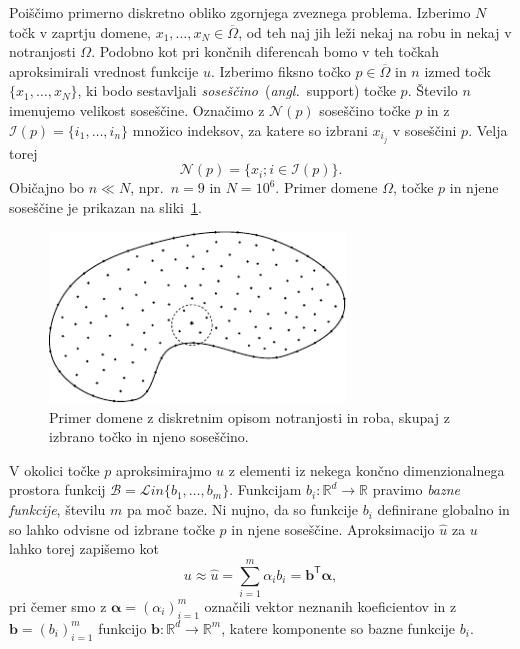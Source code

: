 \documentclass[12pt,a4paper,twoside]{article}
\theoremstyle{definition} %
\theoremstyle{plain} %
\numberwithin{equation}{section}
\newcommand{\R}{\mathbb R}
\newcommand{\Nc}{\mathcal{N}}
\newcommand{\I}{\mathcal{I}}
\newcommand{\B}{\mathcal{B}}
\newcommand{\T}{\mathsf{T}}
\renewcommand{\b}{\boldsymbol}
\newcommand{\zomega}{\overline{\Omega}}
\newcommand{\Lin}{\mathcal{L}in}
\newcommand{\uh}{\hat{u}}
\newcommand{\ang}[1]{(\textit{angl.}\ #1)}
\begin{document}
Poiščimo primerno diskretno obliko zgornjega zveznega problema.
Izberimo $N$ točk v zaprtju domene, $x_1, \dots, x_N \in \zomega$, od teh naj jih leži nekaj na robu
in nekaj v notranjosti $\Omega$. Podobno kot pri končnih diferencah bomo v teh točkah aproksimirali
vrednost funkcije $u$.  Izberimo fiksno točko $p \in \zomega$ in $n$ izmed točk $\{x_1, \dots,
x_N\}$, ki bodo sestavljali \emph{soseščino}~\ang{support} točke $p$. Število $n$ imenujemo velikost
soseščine.  Označimo z $\Nc(p)$ soseščino točke $p$ in z $\I(p) = \{i_1, \dots, i_n\}$ množico
indeksov, za katere so izbrani $x_{i_j}$ v soseščini $p$. Velja torej
\begin{equation}
  \Nc(p) = \{x_i; i \in \I(p)\}.
\end{equation}
Običajno bo $n \ll N$, npr.~$n = 9$ in $N = 10^6$.
Primer domene $\Omega$, točke $p$ in njene soseščine je prikazan na
sliki~\ref{fig:domain-example}.

\begin{figure}[ht]
  \centering
  \includegraphics[width=0.7\textwidth]{images/domain_theoretical.pdf}
  \caption[Domena in diskretizacija notranjosti in roba.]{Primer domene z
  diskretnim opisom notranjosti in roba, skupaj z izbrano točko in njeno
soseščino.}
  \label{fig:domain-example}
\end{figure}

V okolici točke $p$ aproksimirajmo $u$ z elementi iz nekega končno
dimenzionalnega prostora funkcij $\B = \Lin\{b_1, \dots, b_m\}$.
Funkcijam $b_i\colon \R^d \to \R$ pravimo \emph{bazne funkcije},
številu $m$ pa moč baze. Ni nujno, da so funkcije $b_i$ definirane
globalno in so lahko odvisne od izbrane točke $p$ in njene soseščine.
Aproksimacijo $\uh$ za $u$ lahko torej zapišemo kot
\begin{equation}
   u \approx \uh = \sum_{i=1}^m \alpha_i b_i = \b{b}^\T \b{\alpha},
\end{equation}
pri čemer smo z $\b{\alpha} = (\alpha_i)_{i=1}^m$ označili vektor neznanih
koeficientov in z $\b{b} = (b_i)_{i=1}^m$ funkcijo $\b{b}\colon\R^d\to\R^m$, katere
komponente so bazne funkcije $b_i$.
\end{document}
